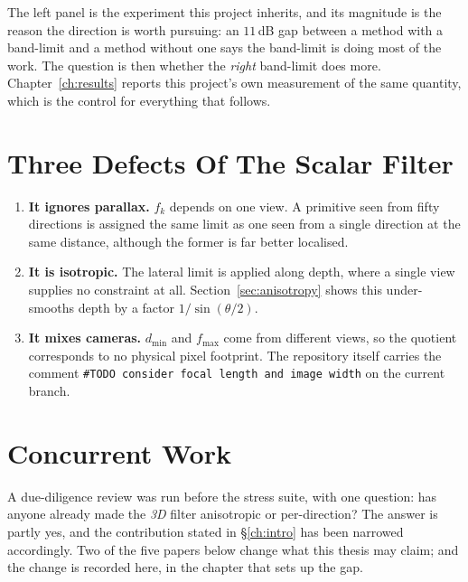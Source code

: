 The left panel is the experiment this project inherits, and its magnitude is the
reason the direction is worth pursuing: an $11$\,dB gap between a method with a
band-limit and a method without one says the band-limit is doing most of the
work. The question is then whether the \emph{right} band-limit does more.
Chapter~\ref{ch:results} reports this project's own measurement of the same
quantity, which is the control for everything that follows.

\section{Three Defects Of The Scalar Filter}
\label{sec:defects}

\begin{enumerate}[leftmargin=1.4em,itemsep=3pt]
  \item \textbf{It ignores parallax.} $f_k$ depends on one view. A primitive seen
        from fifty directions is assigned the same limit as one seen from a single
        direction at the same distance, although the former is far better
        localised.
  \item \textbf{It is isotropic.} The lateral limit is applied along depth, where
        a single view supplies no constraint at all.
        Section~\ref{sec:anisotropy} shows this under-smooths depth by a factor
        $1/\sin(\theta/2)$.
  \item \textbf{It mixes cameras.} $d_{\min}$ and $f_{\max}$ come from different
        views, so the quotient corresponds to no physical pixel footprint. The
        repository itself carries the comment
        \texttt{\#TODO consider focal length and image width} on the current
        branch.
\end{enumerate}

\section{Concurrent Work}
\label{sec:relatedwork}

A due-diligence review was run before the stress suite, with one question: has
anyone already made the \emph{3D} filter anisotropic or per-direction? The answer
is partly yes, and the contribution stated in \S\ref{ch:intro} has been narrowed accordingly. Two of the five papers below change what this
thesis may claim; and the change is recorded here, in the chapter that sets up the gap.

